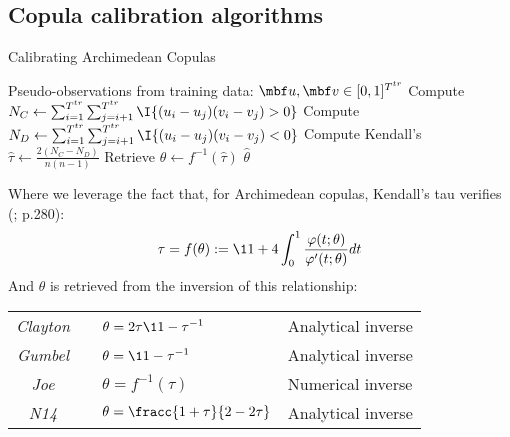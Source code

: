 \documentclass[12pt,a4paper]{article}
\begin{document}

\subsection{Copula calibration algorithms}

\begin{algorithm}[H]
\label{alg:calibrating_archimedean}
\caption{Calibrating Archimedean Copulas}
\begin{algorithmic}[1]
\Require Pseudo-observations from training data: $\mbf u,\mbf v\in [0,1]^{T^{tr}}$
\State Compute $N_C \gets \sum_{i=1}^{T^{tr}}\sum_{j=i+1}^{T^{tr}} \I{(u_i-u_j)(v_i-v_j) > 0}$
\State Compute $N_D \gets \sum_{i=1}^{T^{tr}}\sum_{j=i+1}^{T^{tr}} \I{(u_i-u_j)(v_i-v_j) < 0}$
\State Compute Kendall's $\displaystyle \hat \tau \gets \frac{2(N_C-N_D)}{n(n-1)}$
\State Retrieve $\hat \theta \gets f^{-1}(\hat \tau)$
\Ensure $\hat \theta $
\end{algorithmic}
\end{algorithm}

Where we leverage the fact that, for Archimedean copulas, Kendall's tau verifies (\cite{alexander2008market}; p.280):
$$
\tau 
= f(\theta):=
\1{1+4 \int_{0}^{1} \frac{\varphi(t;\theta)}{\varphi'(t;\theta)}dt}
$$
And $\theta$ is retrieved from the inversion of this relationship:

\vspace{0.2cm}
{\centering
\renewcommand{\arraystretch}{1.4}  
\begin{tabular}{ccll}
\textit{Clayton} && 
$\displaystyle 
\theta = {2\tau}\1{1-\tau}^{-1}
$ 
& Analytical inverse
\\
\textit{Gumbel} && 
$\displaystyle 
\theta = \1{1-\tau}^{-1}
$ 
& Analytical inverse
\\
\textit{Joe} && 
$\displaystyle 
\theta = f^{-1}(\tau) 
$
& Numerical inverse
\\
\textit{N14} && 
$\displaystyle
\theta = \fracc{1+\tau}{2-2\tau}
$
& Analytical inverse
\\
\end{tabular}
\par}
\end{document}

